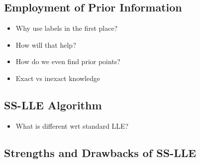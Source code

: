 \subsection{Employment of Prior Information}
\label{prior-info}

\begin{itemize}
  \item Why use labels in the first place?
  \item How will that help?
  \item How do we even find prior points?
  \item Exact vs inexact knowledge
\end{itemize}

\subsection{SS-LLE Algorithm}
\label{algo-sslle}

\begin{itemize}
  \item What is different wrt standard LLE?
\end{itemize}

\subsection{Strengths and Drawbacks of SS-LLE}
\label{pro-con}

